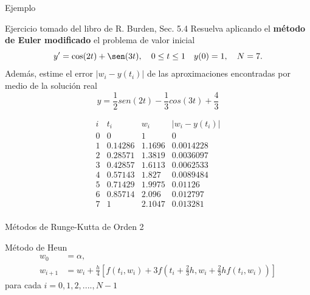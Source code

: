 \begin{frame}{Ejemplo}
\begin{block}{Ejercicio tomado del libro de R. Burden, Sec. 5.4}
Resuelva aplicando el \textbf{método de Euler modificado} el problema de valor inicial
$$y'=\cos(2t)+\sen(3t), \quad 0\leq t\leq 1 \quad y(0)=1, \quad N=7.$$
Además, estime el error $|w_i-y(t_i)|$ de las aproximaciones encontradas por medio de la solución real 
$$y=\frac{1}{2}sen(2t)-\frac{1}{3}cos(3t)+\frac{4}{3}$$
\end{block}
\begin{displaymath}
\begin{array}{r|lll}
i& t_i& w_i & |w_i-y(t_i)|\\
\hline\hline
0&0&1   &       0\\
1&0.14286&1.1696        &       0.0014228\\
2&0.28571&1.3819        &       0.0036097\\
3&0.42857&1.6113        &       0.0062533\\
4&0.57143&1.827 &       0.0089484\\
5&0.71429&1.9975        &       0.01126\\
6&0.85714&2.096 &       0.012797\\
7&1&2.1047      &       0.013281\\
\end{array}
\end{displaymath}
\end{frame}

\begin{frame}{Métodos de Runge-Kutta de Orden 2}
\begin{block}{Método de Heun}
\begin{align*}
w_0 &=\alpha,\\
w_{i+1}&=w_{i}+\frac{h}{4}[f(t_i, w_i)+3f(t_i+\frac{2}{3}h, w_i+\frac{2}{3}hf(t_i, w_i))]
\end{align*}
\hspace{3cm}para cada $i=0, 1, 2,...., N-1$
\end{block}
\end{frame}

